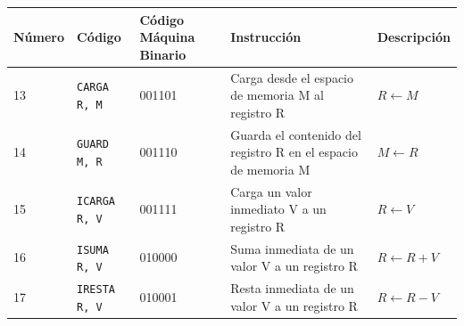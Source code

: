 \documentclass{article}
\begin{document}
\begin{longtable}{|p{}|p{}|p{}|p{}|p{}|}
  \hline
  \textbf{Número} & \textbf{Código}      & \textbf{Código Máquina Binario} & \textbf{Instrucción}                                                                                                                                                                          & \textbf{Descripción}                                                                                                \\
  \hline
  13              & \texttt{CARGA R, M}  & 001101                          & Carga desde el espacio de memoria M al registro R                                                                                                                                             & $R \leftarrow M$                                                                                                    \\
  \hline
  14              & \texttt{GUARD M, R}  & 001110                          & Guarda el contenido del registro R en el espacio de memoria M                                                                                                                                 & $M \leftarrow R$                                                                                                    \\
  \hline
  15              & \texttt{ICARGA R, V} & 001111                          & Carga un valor inmediato V a un registro R                                                                                                                                                    & $R \leftarrow V$                                                                                                    \\
  \hline
  16              & \texttt{ISUMA R, V}  & 010000                          & Suma inmediata de un valor V a un registro R                                                                                                                                                  & $R \leftarrow R + V$                                                                                                \\
  \hline
  17              & \texttt{IRESTA R, V} & 010001                          & Resta inmediata de un valor V a un registro R                                                                                                                                                 & $R \leftarrow R - V$                                                                                                \\

\end{longtable}
\end{document}

